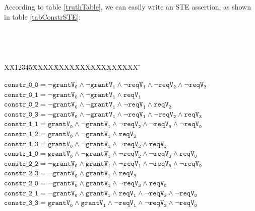 \documentclass[final]{IEEEtran}
\newlength{\fminilength}
\newenvironment{fmini}[1][\linewidth]
  {\setlength{\fminilength}{#1\fboxsep-2\fboxrule}%
   \vspace{2ex}\noindent\begin{lrbox}{\fminibox}\begin{minipage}{\fminilength}%
   \mbox{ }\hfill\vspace{-2.5ex}}%
  {\end{minipage}\end{lrbox}\vspace{1ex}\hspace{0ex}%
   \framebox{\usebox{\fminibox}}}
\newenvironment{specification}
{\noindent\footnotesize\tt\begin{fmini}\begin{tabbing}X\=X12345\=XXXX\=XXXX\=XXXX\=XXXX\=XXXX
\=\+\kill} {\end{tabbing}\normalfont\end{fmini}}
\begin{document}
According to  table \ref{truthTable}, we can easily write an STE
assertion, as shown in table \ref{tabConstrSTE}:
\begin{center}
\begin{table}
\caption{An STE assertion for one-round
arbitration}\label{tabConstrSTE}
\begin{specification}

$\mathtt{constr\_0\_0=   \neg grantV_0\wedge \neg grantV_1\wedge \neg
reqV_1\wedge \neg
reqV_2\wedge \neg reqV_3  }$\\

$\mathtt{constr\_0\_1=   \neg grantV_0\wedge \neg grantV_1\wedge reqV_1  }$\\

$\mathtt{constr\_0\_2= \neg grantV_0\wedge \neg grantV_1\wedge \neg reqV_1\wedge reqV_2 }$\\

$\mathtt{constr\_0\_3= \neg grantV_0\wedge \neg grantV_1\wedge \neg
reqV_1\wedge \neg reqV_2\wedge reqV_3 }$\\


$\mathtt{constr\_1\_1= grantV_0\wedge \neg grantV_1\wedge \neg
reqV_2\wedge \neg
reqV_3\wedge \neg reqV_0 }$\\

$\mathtt{ constr\_1\_2= grantV_0\wedge \neg grantV_1\wedge reqV_2  }$\\

$\mathtt{constr\_1\_3= grantV_0\wedge \neg grantV_1\wedge \neg reqV_2\wedge reqV_3}$\\

$\mathtt{constr\_1\_0= grantV_0\wedge \neg grantV_1\wedge \neg
reqV_2\wedge \neg
reqV_3\wedge reqV_0}$\\

$\mathtt{constr\_2\_2= \neg grantV_0\wedge grantV_1\wedge \neg
reqV_1\wedge \neg reqV_3\wedge \neg
reqV_0 }$\\

$\mathtt{constr\_2\_3= \neg grantV_0\wedge grantV_1\wedge reqV_3  }$\\

$\mathtt{constr\_2\_0= \neg grantV_0\wedge grantV_1\wedge \neg  reqV_3\wedge reqV_0 }$\\

$\mathtt{constr\_2\_1= \neg grantV_0\wedge grantV_1\wedge reqV_1\wedge
\neg reqV_3\wedge \neg
reqV_0 }$\\

$\mathtt{constr\_3\_3= grantV_0\wedge grantV_1\wedge \neg reqV_1\wedge
\neg reqV_2\wedge \neg
reqV_0 }$\\


\end{specification}
\end{table}
\end{center}
\end{document}

